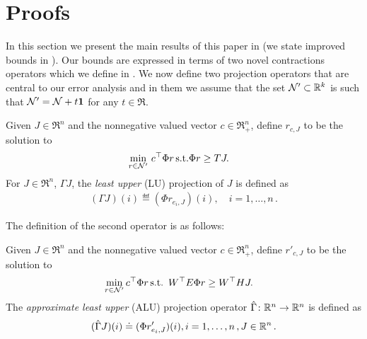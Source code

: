 \section{Proofs}\label{sec:improv}


In this section we present the main results of this paper in  (we state improved bounds in ). Our bounds are expressed in terms of two novel contractions operators which we define in . We now define two projection operators that are central to our error analysis and in them we assume that the set $\mathcal{N}'\subset \mathbb{R}^k$ is such that $\mathcal{N}' = \mathcal{N} + t \mathbf{1}$ for any $t\in \Re$.
\begin{definition}\label{lubpop}
Given $J\in \Re^n$ and the nonnegative valued vector $c\in \Re^n_+$, define $r_{c,J}$ to be the solution to
\begin{align}
\label{lubplp}
\begin{split}
\underset{r\in \N'}{\min} &\,\, c^\top \Phi r\,\mb
\text{s.t.} \mb \Phi r\geq  TJ.
\end{split}
\end{align}
For $J\in \Re^n$, $\Gamma J$, the \emph{least upper} (LU) projection of $J$ is defined as
\begin{align}\label{gamdef}
(\Gamma J)(i)\eqdef(\Phi r_{e_i,J})(i),\quad i=1,\ldots,n\,.
\end{align}
\end{definition}
The definition of the second operator is as follows:
\begin{definition}\label{alubpop}
Given $J\in \Re^n$ and the nonnegative valued vector $c\in \Re^n_+$, define $r'_{c,J}$ to be the solution to
\begin{align}\label{alubplp}
\underset{r\in \N'}{\min}& \,\mb c^\top \Phi r\,\mb
\text{s.t.} \,\,\, W^\top E \Phi r\geq W^\top HJ.
\end{align}
The \emph{approximate least upper} (ALU) projection operator
$\hat{\Gamma} \colon \mathbb{R}^n \rightarrow \mathbb{R}^n$ is defined as
\begin{align}\label{tgamdef}
(\hg J)(i)\eqdef(\Phi r'_{e_i,J})(i), \mb i=1,\ldots,n\,, J\in \Re^n\,.
\end{align}
\end{definition}
